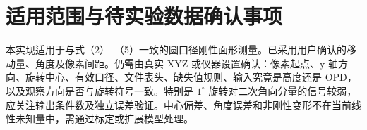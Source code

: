 \documentclass[UTF8,a4paper,zihao=-4]{ctexart}
\begin{document}
\section{适用范围与待实验数据确认事项}
本实现适用于与式（2）--（5）一致的圆口径刚性面形测量。已采用用户确认的移动量、角度及像素间距。仍需由真实 XYZ 或仪器设置确认：像素起点、y 轴方向、旋转中心、有效口径、文件表头、缺失值规则、输入究竟是高度还是 OPD，以及观察方向是否与旋转符号一致。特别是 $1^\circ$ 旋转对二次角向分量的信号较弱，应关注输出条件数及独立误差验证。中心偏差、角度误差和非刚性变形不在当前线性未知量中，需通过标定或扩展模型处理。
\end{document}
